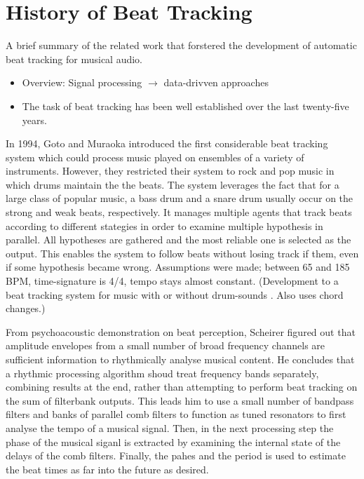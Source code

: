 \documentclass{scrartcl}
\begin{document}
\newpage
\section{History of Beat Tracking}

A brief summary of the related work that forstered the development of automatic beat tracking for musical audio.
\begin{itemize}
\item Overview: Signal processing $\rightarrow$ data-drivven approaches
\item The task of beat tracking has been well established over the last twenty-five years. 
\end{itemize}


In 1994, Goto and Muraoka \cite{Goto1994} introduced the first considerable beat tracking system which could process music played on ensembles of a variety of instruments. However, they restricted their system to rock and pop music in which drums maintain the the beats. The system leverages the fact that for a large class of popular music, a bass drum and a snare drum usually occur on the strong and weak beats, respectively. It manages multiple agents that track beats according to different stategies in order to examine multiple hypothesis in parallel. All hypotheses are gathered and the most reliable one is selected as the output. This enables the system to follow beats without losing track if them, even if some hypothesis became wrong. Assumptions were made; between 65 and 185 BPM, time-signature is 4/4, tempo stays almost constant. (Development to a beat tracking system for music with or without drum-sounds \cite{Goto2001}. Also uses chord changes.)

From psychoacoustic demonstration on beat perception, Scheirer \cite{Scheirer1998} figured out that amplitude envelopes from a small number of broad frequency channels are sufficient information to rhythmically analyse musical content. He concludes that a rhythmic processing algorithm shoud treat frequency bands separately, combining results at the end, rather than attempting to perform beat tracking on the sum of filterbank outputs. This leads him to use a small number of bandpass filters and banks of parallel comb filters to function as tuned resonators to first analyse the tempo of a musical signal. Then, in the next processing step the phase of the musical siganl is extracted by examining the internal state of the delays of the comb filters. Finally, the pahes and the period is used to estimate the beat times as far into the future as desired. 
\end{document}
